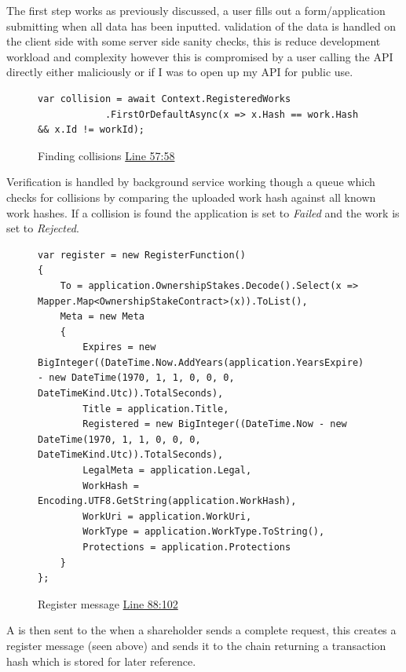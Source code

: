 The first step works as previously discussed, a user fills out a form/application submitting when all data has been inputted. validation of the data is handled on the client side with some server side sanity checks, this is reduce development workload and complexity however this is compromised by a user calling the API directly either maliciously or if I was to open up my API for public use.

\begin{figure}[H]
\caption{Finding collisions \href{https://github.com/MrHarrisonBarker/CRPL/blob/main/CRPL.Web/Services/WorksVerificationService.cs}{Line 57:58}}
\centering
\begin{lstlisting}[language=CSharp]
var collision = await Context.RegisteredWorks
           	.FirstOrDefaultAsync(x => x.Hash == work.Hash && x.Id != workId);
\end{lstlisting}
\end{figure}

Verification is handled by background service working though a queue which checks for collisions by comparing the uploaded work hash against all known work hashes. If a collision is found the application is set to \textit{Failed} and the work is set to \textit{Rejected}.

\begin{figure}[H]
\caption{Register message \href{https://github.com/MrHarrisonBarker/CRPL/blob/main/CRPL.Web/Services/RegistrationService.cs}{Line 88:102}}
\centering
\begin{lstlisting}[language=CSharp]
var register = new RegisterFunction()
{
	To = application.OwnershipStakes.Decode().Select(x => Mapper.Map<OwnershipStakeContract>(x)).ToList(),
	Meta = new Meta
	{
		Expires = new BigInteger((DateTime.Now.AddYears(application.YearsExpire) - new DateTime(1970, 1, 1, 0, 0, 0, DateTimeKind.Utc)).TotalSeconds),
		Title = application.Title,
		Registered = new BigInteger((DateTime.Now - new DateTime(1970, 1, 1, 0, 0, 0, DateTimeKind.Utc)).TotalSeconds),
		LegalMeta = application.Legal,
		WorkHash = Encoding.UTF8.GetString(application.WorkHash),
		WorkUri = application.WorkUri,
		WorkType = application.WorkType.ToString(),
		Protections = application.Protections
	}
};
\end{lstlisting}
\end{figure}

A  is then sent to the  when a shareholder sends a complete request, this creates a register message (seen above) and sends it to the chain returning a transaction hash which is stored for later reference.

